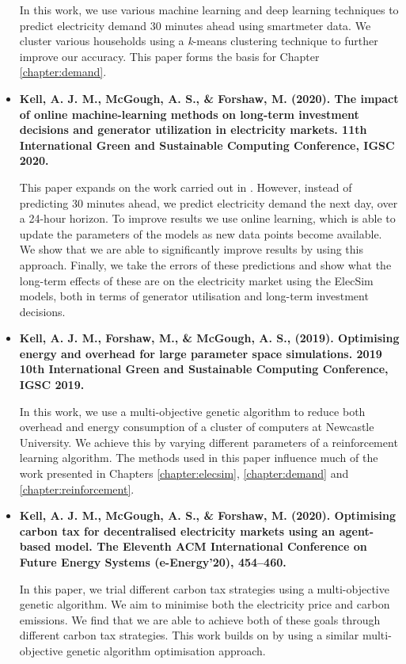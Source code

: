 \begin{itemize}
	In this work, we use various machine learning and deep learning techniques to predict electricity demand 30 minutes ahead using \gls{smartmeter} data. We cluster various households using a \textit{k}-means clustering technique to further improve our accuracy. This paper forms the basis for Chapter \ref{chapter:demand}.
	
	\item[\textbf{\cite{Kell2020c}}] \textbf{Kell, A. J. M., McGough, A. S., \& Forshaw, M. (2020). The impact of online machine-learning methods on long-term investment decisions and generator utilization in electricity markets. 11th International Green and Sustainable Computing Conference, IGSC 2020.}
	
	This paper expands on the work carried out in \cite{Kell2018a}. However, instead of predicting 30 minutes ahead, we predict electricity demand the next day, over a 24-hour horizon. To improve results we use online learning, which is able to update the parameters of the models as new data points become available. We show that we are able to significantly improve results by using this approach. Finally, we take the errors of these predictions and show what the long-term effects of these are on the electricity market using the ElecSim models, both in terms of generator utilisation and long-term investment decisions.
	
	\item[\textbf{\cite{Kell2019}}] \textbf{Kell, A. J. M., Forshaw, M., \& McGough, A. S., (2019). Optimising energy and overhead for large parameter space simulations. 2019 10th International Green and Sustainable Computing Conference, IGSC 2019. }
	
	In this work, we use a multi-objective genetic algorithm to reduce both overhead and energy consumption of a cluster of computers at Newcastle University. We achieve this by varying different parameters of a reinforcement learning algorithm. The methods used in this paper influence much of the work presented in Chapters \ref{chapter:elecsim}, \ref{chapter:demand} and \ref{chapter:reinforcement}.
	
	\item[\textbf{\cite{Kell2020a}}] \textbf{Kell, A. J. M., McGough, A. S., \& Forshaw, M. (2020). Optimising carbon tax for decentralised electricity markets using an agent-based model. The Eleventh ACM International Conference on Future Energy Systems (e-Energy’20), 454–460.}
	
	In this paper, we trial different carbon tax strategies using a multi-objective genetic algorithm. We aim to minimise both the electricity price and carbon emissions. We find that we are able to achieve both of these goals through different carbon tax strategies. This work builds on \cite{Kell2019} by using a similar multi-objective genetic algorithm optimisation approach. 
	
	
\end{itemize}


